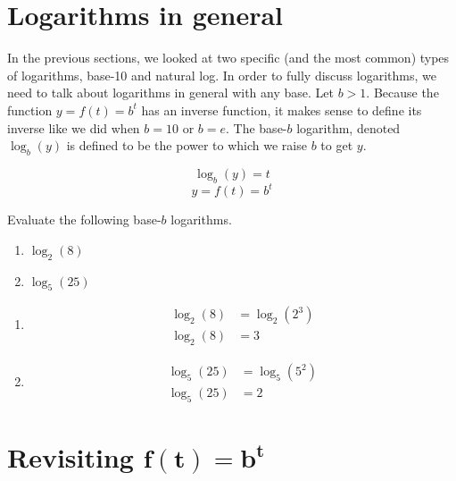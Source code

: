 \documentclass[nooutcomes]{ximera}
\begin{document}
\begin{exploration}
\begin{enumerate}[label=\alph*.]
\end{enumerate}
%
\end{exploration}

%
%
%
\section{Logarithms in general}
 In the previous sections, we looked at two specific (and the most common) types of logarithms, base-10 and natural log. In order to fully discuss logarithms, we need to talk about logarithms in general with any base. Let $b>1$. Because the function $y=f(t)=b^t$ has an inverse function, it makes sense to define its inverse like we did when $b=10$ or $b=e$. The base-$b$ logarithm, denoted $\log_{b}(y)$ is defined to be the power to which we raise $b$ to get $y$. 

\[
\log_{b}(y)=t
\]
\[
y=f(t)=b^t
\]

\begin{example} Evaluate the following base-$b$ logarithms.
\begin{enumerate}
\item $\log_{2}(8)$
\item $\log_{5}(25)$
\end{enumerate}
\begin{explanation}
\begin{enumerate}
\item 
\begin{align*}
\log_{2}(8)&=\log_{2}(2^3)\\
\log_{2}(8)&= 3
\end{align*}

\item
\begin{align*} 
\log_{5}(25)&=\log_{5}(5^2)\\
\log_{5}(25) & = 2
\end{align*}

\end{enumerate}
\end{explanation}
\end{example}

%
%
%
\section{Revisiting $\mathbf{f(t) = b^t}$}
\end{document}
